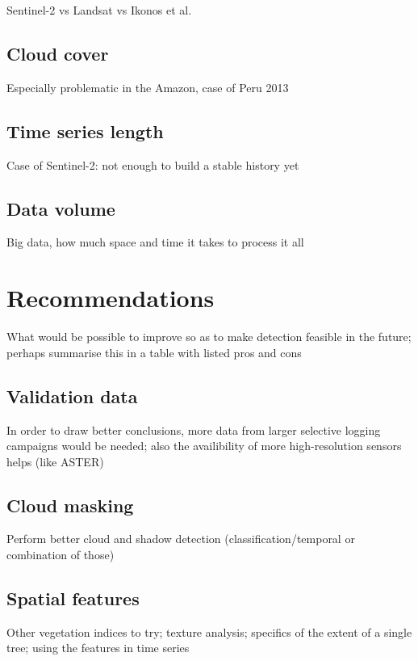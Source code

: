 \documentclass[a4paper,12pt]{scrbook}
\begin{document}
Sentinel-2 vs Landsat vs Ikonos et al.

\subsection{Cloud cover}

Especially problematic in the Amazon, case of Peru 2013

\subsection{Time series length}

Case of Sentinel-2: not enough to build a stable history yet

\subsection{Data volume}

Big data, how much space and time it takes to process it all

\section{Recommendations}

What would be possible to improve so as to make detection feasible in the future; perhaps summarise this in a table with listed pros and cons

\subsection{Validation data}

In order to draw better conclusions, more data from larger selective logging campaigns would be needed; also the availibility of more high-resolution sensors helps (like ASTER)

\subsection{Cloud masking}

Perform better cloud and shadow detection (classification/temporal or combination of those)

\subsection{Spatial features}

Other vegetation indices to try; texture analysis; specifics of the extent of a single tree; using the features in time series
\end{document}
